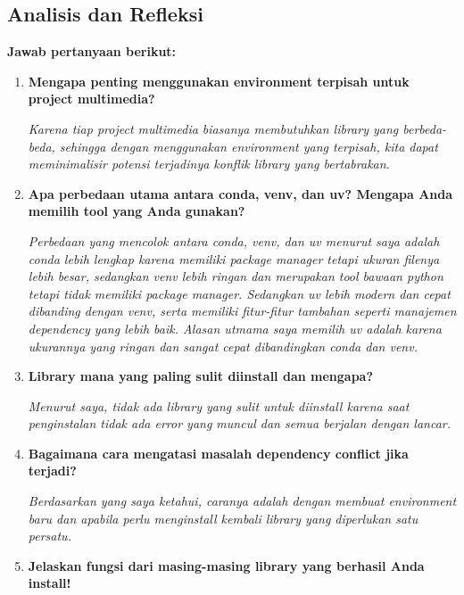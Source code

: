 \documentclass[11pt,a4paper]{article}
\begin{document}
\subsection{Analisis dan Refleksi}
\textbf{Jawab pertanyaan berikut:}

\begin{enumerate}
    \item \textbf{Mengapa penting menggunakan environment terpisah untuk project multimedia?}
    
    \textit{Karena tiap project multimedia biasanya membutuhkan library yang berbeda-beda, sehingga dengan menggunakan environment yang terpisah, kita dapat meminimalisir potensi terjadinya konflik library yang bertabrakan.}
    
    \item \textbf{Apa perbedaan utama antara conda, venv, dan uv? Mengapa Anda memilih tool yang Anda gunakan?}
    
    \textit{Perbedaan yang mencolok antara conda, venv, dan uv menurut saya adalah conda lebih lengkap karena memiliki package manager tetapi ukuran filenya lebih besar, sedangkan venv lebih ringan dan merupakan tool bawaan python tetapi tidak memiliki package manager. Sedangkan uv lebih modern dan cepat dibanding dengan venv, serta memiliki fitur-fitur tambahan seperti manajemen dependency yang lebih baik. Alasan utmama saya memilih uv adalah karena ukurannya yang ringan dan sangat cepat dibandingkan conda dan venv.}
    
    \item \textbf{Library mana yang paling sulit diinstall dan mengapa?}
    
    \textit{Menurut saya, tidak ada library yang sulit untuk diinstall karena saat penginstalan tidak ada error yang muncul dan semua berjalan dengan lancar.}
    
    \item \textbf{Bagaimana cara mengatasi masalah dependency conflict jika terjadi?}
    
    \textit{Berdasarkan yang saya ketahui, caranya adalah dengan membuat environment baru dan apabila perlu menginstall kembali library yang diperlukan satu persatu.}
    
    \item \textbf{Jelaskan fungsi dari masing-masing library yang berhasil Anda install!}
    

\end{enumerate}
\end{document}

